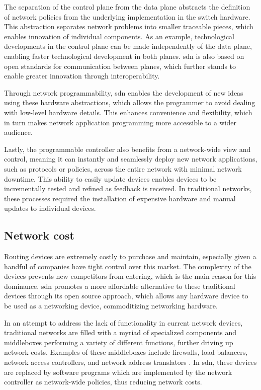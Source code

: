 The separation of the control plane from the data plane abstracts the definition of network policies from the underlying implementation in the switch hardware. This abstraction separates network problems into smaller traceable pieces, which enables innovation of individual components\cite{kreutz_software-defined_2015}. As an example, technological developments in the control plane can be made independently of the data plane, enabling faster technological development in both planes\cite{thyagaturu_software_2016}. \gls{sdn} is also based on open standards for communication between planes, which further stands to enable greater innovation through interoperability.

Through network programmability, \gls{sdn} enables the development of new ideas using these hardware abstractions, which allows the programmer to avoid dealing with low-level hardware details. This enhances convenience and flexibility, which in turn makes network application programming more accessible to a wider audience.

Lastly, the programmable controller also benefits from a network-wide view and control, meaning it can instantly and seamlessly deploy new network applications, such as protocols or policies, across the entire network with minimal network downtime. This ability to easily update devices enables devices to be incrementally tested and refined as feedback is received. In traditional networks, these processes required the installation of expensive hardware and manual updates to individual devices. \cite{xia_survey_2015}

\subsection{Network cost}
Routing devices are extremely costly to purchase and maintain, especially given a handful of companies have tight control over this market. The complexity of the devices prevents new competitors from entering, which is the main reason for this dominance. \gls{sdn} promotes a more affordable alternative to these traditional devices through its open source approach, which allows any hardware device to be used as a networking device, commoditizing networking hardware. \cite{nunes_survey_2014}

In an attempt to address the lack of functionality in current network devices, traditional networks are filled with a myriad of specialized components and middleboxes performing a variety of different functions\cite{feamster_road_2013}\cite{kreutz_software-defined_2015}, further driving up network costs. Examples of these middleboxes include firewalls, load balancers, network access controllers, and network address translators \cite{nunes_survey_2014}. In \gls{sdn}, these devices are replaced by software programs which are implemented by the network controller as network-wide policies, thus reducing network costs.

